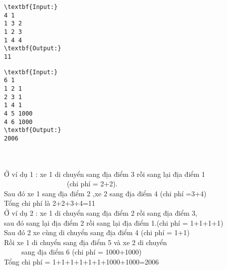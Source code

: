 \begin{verbatim}
\textbf{Input:} 
4 1
1 3 2
1 2 3
1 4 4
\textbf{Output:}
11
\end{verbatim}
\begin{verbatim}
\textbf{Input:} 
6 1
1 2 1
2 3 1
1 4 1
4 5 1000
4 6 1000
\textbf{Output:}
2006\end{verbatim}


\\
\\Ở ví dụ 1 : xe 1 di chuyển sang địa điểm 3 rồi sang lại địa điểm 1
\\                  (chi phí = 2+2).
\\Sau đó xe 1 sang địa điểm 2 ,xe 2 sang địa điểm 4 (chi phí =3+4)
\\Tổng chi phí là 2+2+3+4=11
\\Ở ví dụ 2 : xe 1 di chuyển sang địa điểm 2 rồi sang địa điểm 3,
\\sau đó sang lại địa điểm 2 rồi sang lại địa điểm 1.(chi phí = 1+1+1+1)
\\Sau đó 2 xe cùng di chuyển sang địa điểm 4 (chi phí = 1+1)
\\Rồi xe 1 di chuyển sang địa điểm 5 và xe 2 di chuyển
\\     sang địa điểm 6 (chi phí = 1000+1000)
\\Tổng chi phí = 1+1+1+1+1+1+1000+1000=2006
\\
\\
